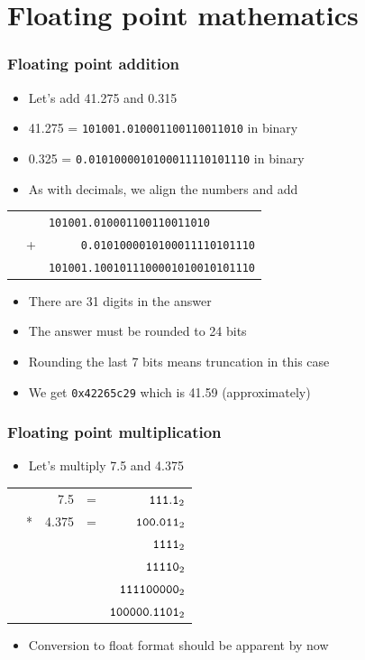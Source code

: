 \documentclass{beamer}
\begin{document}
\section{Floating point mathematics}

\begin{frame}
    \frametitle{Floating point addition}
    \begin{itemize}
        \item Let's add 41.275 and 0.315
        \item 41.275 = {\tt 101001.010001100110011010} in binary
        \item 0.325 = {\tt 0.0101000010100011110101110} in binary
        \item As with decimals, we align the numbers and add
    \end{itemize}
    \begin{tabular}{cll}
    \qquad\quad &     & {\tt 101001.010001100110011010} \\
       &  +   & {\tt \ \ \ \ \ 0.0101000010100011110101110}\\ \cline{2-3}
       &      & {\tt 101001.1001011100001010010101110}
    \end{tabular}
    \begin{itemize}
        \item There are 31 digits in the answer
        \item The answer must be rounded to 24 bits
        \item Rounding the last 7 bits means truncation in this case
        \item We get {\tt 0x42265c29} which is 41.59 (approximately)
    \end{itemize}

\end{frame}

\begin{frame}
    \frametitle{Floating point multiplication}
    \begin{itemize}
        \item Let's multiply 7.5 and 4.375
    \end{itemize}
    \begin{tabular}{ccrcr}
        \qquad\quad & &  7.5 & = & ${\tt 111.1}_2$ \\ 
        &* &  4.375 & = & ${\tt 100.011}_2$ \\ \cline{2-5}
        & &       &   & ${\tt 1111}_2$ \\
        & &       &   & ${\tt 11110}_2$ \\
        & &       &   & ${\tt 111100000}_2$ \\ \cline{2-5}
            &&       &   & ${\tt 100000.1101}_2$
    \end{tabular}
    \begin{itemize}
        \item Conversion to float format should be apparent by now
    \end{itemize}

\end{frame}
\end{document}
